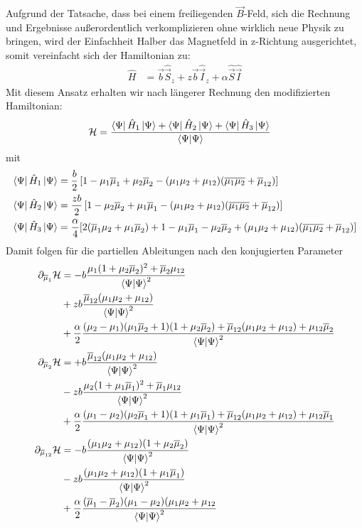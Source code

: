 Aufgrund der Tatsache, dass bei einem freiliegenden $\vec{B}$-Feld, sich die Rechnung und Ergebnisse außerordentlich verkomplizieren ohne 
wirklich neue Physik zu bringen, wird der Einfachheit Halber das Magnetfeld in z-Richtung ausgerichtet, somit vereinfacht sich der 
Hamiltonian zu:
\begin{align}
    \hat{H} &= \vec{b}\hat{\vec{S}}_z +  z\vec{b}\hat{\vec{I}}_z + \alpha \hat{\vec{S}}\hat{\vec{I}}
\end{align}
Mit diesem Ansatz erhalten wir nach längerer Rechnung den modifizierten Hamiltonian:
\begin{align}
    \mathcal{H} &= \frac{\bra{\Psi}\hat{H}_1\ket{\Psi} +\bra{\Psi}\hat{H}_2\ket{\Psi} + \bra{\Psi}\hat{H}_3\ket{\Psi}}{\bra{\Psi}\ket{\Psi}}
\end{align}
mit 
\begin{align*}
    \bra{\Psi}\hat{H}_1\ket{\Psi} &=  \frac{b}{2}\left[ 1- \mu_1\overline{\mu}_1 + \mu_2\overline{\mu}_2 - (\mu_1 \mu_2 + \mu_{12})(\overline{\mu_1\mu_2} + \overline{\mu}_{12})\right] \\
    \bra{\Psi}\hat{H}_2\ket{\Psi} &=  \frac{z b}{2}\left[ 1- \mu_2\overline{\mu}_2 + \mu_1\overline{\mu}_1 - (\mu_1 \mu_2 + \mu_{12})(\overline{\mu_1\mu_2} + \overline{\mu}_{12})\right] \\
    \bra{\Psi}\hat{H}_3\ket{\Psi} &= \frac{\alpha}{4}[2(\overline{\mu}_1\mu_2 + \mu_1\overline{\mu}_2) + 1 - \mu_1\overline{\mu}_1 - \mu_2\overline{\mu}_2 + (\mu_1 \mu_2 + \mu_{12})(\overline{\mu_1\mu_2} + \overline{\mu}_{12})]
\end{align*}
\noindent Damit folgen für die partiellen Ableitungen nach den konjugierten Parameter
\begin{align*}
    \partial_{\overline{\mu}_1} \mathcal{H} &= 
    -b \frac{\mu_1(1+\mu_2\overline{\mu}_2)^2 + \overline{\mu}_2\mu_{12}}{\bra{\Psi}\ket{\Psi}^2}\\
    &+z b \frac{\overline{\mu}_{12}(\mu_1\mu_2 + \mu_{12})}{\bra{\Psi}\ket{\Psi}^2}\\
    &+\frac{\alpha}{2}\frac{(\mu_2-\mu_1)(\mu_1\overline{\mu}_2+1)(1+\mu_2\overline{\mu}_2)+\overline{\mu}_{12}(\mu_1\mu_2 + \mu_{12}) + \mu_{12}\overline{\mu}_2}{\bra{\Psi}\ket{\Psi}^2}\\
    \partial_{\overline{\mu}_2} \mathcal{H} &= 
    +b \frac{\overline{\mu}_{12}(\mu_1\mu_2 + \mu_{12})}{\bra{\Psi}\ket{\Psi}^2}\\
    &-z b \frac{\mu_2(1+\mu_1\overline{\mu}_1)^2 + \overline{\mu}_1\mu_{12}}{\bra{\Psi}\ket{\Psi}^2}\\
    &+\frac{\alpha}{2}\frac{(\mu_1-\mu_2)(\mu_2\overline{\mu}_1+1)(1+\mu_1\overline{\mu}_1)+\overline{\mu}_{12}(\mu_1\mu_2 + \mu_{12}) + \mu_{12}\overline{\mu}_1}{\bra{\Psi}\ket{\Psi}^2}\\
    \partial_{\overline{\mu}_{12}} \mathcal{H} &= 
    -b\frac{(\mu_1\mu_2+\mu_{12})(1+\mu_2\overline{\mu}_2)}{\bra{\Psi}\ket{\Psi}^2}\\
    &-zb\frac{(\mu_1\mu_2+\mu_{12})(1+\mu_1\overline{\mu}_1)}{\bra{\Psi}\ket{\Psi}^2}\\
    &+\frac{\alpha}{2}\frac{(\overline{\mu}_1-\overline{\mu}_2)(\mu_1-\mu_2)(\mu_1\mu_2+\mu_{12}}{\bra{\Psi}\ket{\Psi}^2}
\end{align*}
